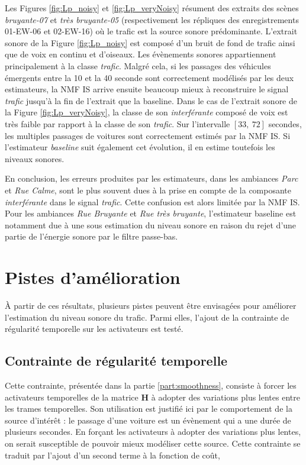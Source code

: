 Les Figures \ref{fig:Lp_noisy} et \ref{fig:Lp_veryNoisy} résument des extraits des scènes \textit{bruyante-07} et \textit{très bruyante-05} (respectivement les répliques des enregistrements 01-EW-06 et 02-EW-16) où le trafic est la source sonore prédominante. L'extrait sonore de la Figure \ref{fig:Lp_noisy} est composé d'un bruit de fond de trafic ainsi que de voix en continu et d'oiseaux. Les évènements sonores appartiennent principalement à la classe \textit{trafic}. Malgré cela, si les passages des véhicules émergents entre la 10\ieme{} et la 40\ieme{} seconde sont correctement modélisés par les deux estimateurs, la NMF IS arrive ensuite beaucoup mieux à reconstruire le signal \textit{trafic} jusqu'à la fin de l'extrait que la baseline. Dans le cas de l'extrait sonore de la Figure \ref{fig:Lp_veryNoisy}, la classe de son \textit{interférante} composé de voix est très faible par rapport à la classe de son \textit{trafic}. Sur l'intervalle $\left[ 33,~72 \right]$ secondes, les multiples passages de voitures sont correctement estimés par la NMF IS. Si l'estimateur \textit{baseline} suit également cet évolution, il en estime toutefois les niveaux sonores.

En conclusion, les erreurs produites par les estimateurs, dans les ambiances \textit{Parc} et \textit{Rue Calme}, sont le plus souvent dues à la prise en compte de la composante \textit{interférante} dans le signal \textit{trafic}. Cette confusion est alors limitée par la NMF IS. Pour les ambiances \textit{Rue Bruyante} et \textit{Rue très bruyante}, l'estimateur baseline est notamment due à une sous estimation du niveau sonore en raison du rejet d'une partie de l'énergie sonore par le filtre passe-bas. 

\section{Pistes d'amélioration}

\`A partir de ces résultats, plusieurs pistes peuvent être envisagées pour améliorer l'estimation du niveau sonore du trafic. Parmi elles, l'ajout de la contrainte de régularité temporelle sur les activateurs est testé.

\subsection{Contrainte de régularité temporelle}

Cette contrainte, présentée dans la partie \ref{part:smoothness}, consiste à forcer les activateurs temporelles de la matrice $\mathbf{H}$ à adopter des variations plus lentes entre les trames temporelles. Son utilisation est justifié ici par le comportement de la source d'intérêt : le passage d'une voiture est un évènement qui a une durée de plusieurs secondes. En forçant les activateurs à adopter des variations plus lentes, on serait susceptible de pouvoir mieux modéliser cette source. Cette contrainte se traduit par l'ajout d'un second terme à la fonction de coût, 


